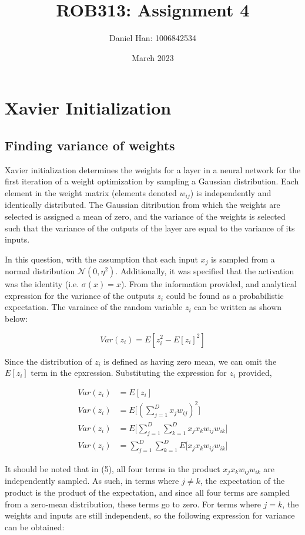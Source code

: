 \documentclass{article}
\title{ROB313: Assignment 4}
\author{Daniel Han: 1006842534}
\date{March 2023}
\begin{document}
\maketitle


\section{Xavier Initialization}
\subsection{Finding variance of weights}
Xavier initialization determines the weights for a layer in a neural network for the first iteration of a weight optimization by sampling a Gaussian distribution. Each element in the weight matrix (elements denoted $w_{ij}$) is independently and identically distributed. The Gaussian ditribution from which the weights are selected is assigned a mean of zero, and the variance of the weights is selected such that the variance of the outputs of the layer are equal to the variance of its inputs.

In this question, with the assumption that each input $x_j$ is sampled from a normal distribution $\mathcal{N}(0, \eta^2)$. Additionally, it was specified that the activation was the identity (i.e. $\sigma (x) = x$). From the information provided, and analytical expression for the variance of the outputs $z_i$ could be found as a probabilistic expectation. The varaince of the random variable $z_i$ can be written as shown below:

\begin{equation}
Var(z_i) = E[z_{i}^{2}- E[z_i]^2]
\end{equation}

Since the distribution of $z_i$ is defined as having zero mean, we can omit the $E[z_i]$ term in the epxression. Substituting the expression for $z_i$ provided,

\begin{align}
Var(z_i) &= E[z_i] \\
Var(z_i) &= E\Big[(\sum_{j=1}^{D} x_j w_{ij})^2\Big]\\
Var(z_i) &= E\Big[\sum_{j=1}^{D} \sum_{k=1}^{D} x_j x_k w_{ij} w_{ik}\Big]\\
Var(z_i) &= \sum_{j=1}^{D} \sum_{k=1}^{D} E \Big[x_j x_k w_{ij} w_{ik}\Big]
\end{align}

It should be noted that in (5), all four terms in the product $x_j x_k w_{ij} w_{ik}$ are independently sampled. As such, in terms where $j \neq k$, the expectation of the product is the product of the expectation, and since all four terms are sampled from a zero-mean distribution, these terms go to zero. For terms where $j=k$, the weights and inputs are still independent, so the following expression for variance can be obtained:
\end{document}
